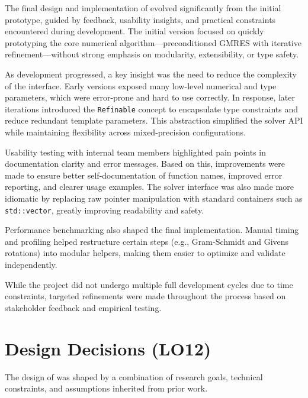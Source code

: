 \documentclass{article}
\begin{document}
The final design and implementation of \progname{} evolved significantly from
the initial prototype, guided by feedback, usability insights, and practical
constraints encountered during development. The initial version focused on
quickly prototyping the core numerical algorithm—preconditioned GMRES with
iterative refinement—without strong emphasis on modularity, extensibility, or
type safety.

As development progressed, a key insight was the need to reduce the complexity
of the interface. Early versions exposed many low-level numerical and type
parameters, which were error-prone and hard to use correctly. In response, later
iterations introduced the \texttt{Refinable} concept to encapsulate type constraints
and reduce redundant template parameters. This abstraction simplified the solver
API while maintaining flexibility across mixed-precision configurations.

Usability testing with internal team members highlighted pain points in
documentation clarity and error messages. Based on this, improvements were made
to ensure better self-documentation of function names, improved error reporting,
and clearer usage examples. The solver interface was also made more idiomatic by
replacing raw pointer manipulation with standard containers such as
\texttt{std::vector}, greatly improving readability and safety.

Performance benchmarking also shaped the final implementation. Manual timing and
profiling helped restructure certain steps (e.g., Gram-Schmidt and Givens
rotations) into modular helpers, making them easier to optimize and validate
independently.

While the project did not undergo multiple full development cycles due to time
constraints, targeted refinements were made throughout the process based on
stakeholder feedback and empirical testing.

\section{Design Decisions (LO12)}


The design of \progname{} was shaped by a combination of research goals,
technical constraints, and assumptions inherited from prior work.
\end{document}
